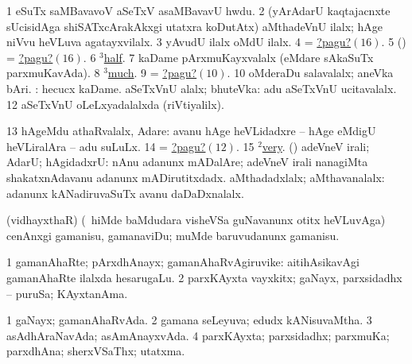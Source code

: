 \noindent
\gl{\pagu}
\bmng
\bnum
\num{1}  eSuTx saMBavavoV aSeTxV asaMBavavU hwdu. 
\num{2}  (yArAdarU kaqtajacnxte sUcisidAga shiSATxcArakAkxgi utatxra koDutAtx) aMthadeVnU ilalx; hAge niVvu heVLuva agatayxvilalx. 
\num{3}  yAvudU ilalx oMdU ilalx. 
\num{4}  = \hyperlink{notpagu16}{?pagu?\((16)\)}. 
\num{5} (\pArxparx) = \hyperlink{notpagu16}{?pagu?\((16)\)}. 
\num{6}  \hyperref{kandict_h.pdf}{H}{half(3) nuga}{$^3$half}. 
\num{7}  kaDame pArxmuKayxvalalx (eMdare sAkaSuTx parxmuKavAda). 
\num{8}  \hyperref{kandict_m.pdf}{M}{much(3) pagu(6)}{$^3$much}. 
\num{9}  = \hyperlink{notpagu10}{?pagu?\((10)\)}. 
\hypertarget{notpagu10}{} 
\num{10}  oMderaDu salavalalx; aneVka bAri. 
 : 
\banum
{} hecucx kaDame. 
 aSeTxVnU alalx; bhuteVka:  adu aSeTxVnU ucitavalalx. 
\hypertarget{notpagu12}{} 
\eanum
\numie
\num{12}  aSeTxVnU oLeLxyadalalxda (riVtiyalilx). 
\num{13}  hAgeMdu athaRvalalx, Adare:  avanu hAge heVLidadxre -- hAge eMdigU heVLiralAra -- adu suLuLx. 
\num{14}  = \hyperlink{notpagu12}{?pagu?\((12)\)}. 
\num{15}  \hyperref{kandict_v.pdf}{V}{very(2) pagu(1)}{$^2$very}. 
\hypertarget{notpagu16}{} 
 (\pArxparx) 
\banum
{} adeVneV irali; AdarU; hAgidadxrU:  nAnu adanunx mADalAre; adeVneV irali nanagiMta shakatxnAdavanu adanunx mADirutitxdadx. 
 aMthadadxlalx; aMthavanalalx: adanunx kANadiruvaSuTx avanu daDaDxnalalx. 
\eanum
\numie
\enum
\emng
\eentry

\bentry
{}
\gl{\sakirx}
\expl{\Latin}
\bmng
(vidhayxthaR) (\sA\ hiMde baMdudara visheVSa guNavanunx otitx heVLuvAga) cenAnxgi gamanisu, gamanaviDu; muMde baruvudanunx gamanisu. 
\emng
\eentry

\bentry
{}
\gl{\nA}
\bmng
\bnum
\num{1} gamanAhaRte; pArxdhAnayx; gamanAhaRvAgiruvike:  aitihAsikavAgi gamanAhaRte ilalxda hesarugaLu. 
\num{2} parxKAyxta vayxkitx; gaNayx, parxsidadhx -- puruSa; KAyxtanAma. 
\enum
\emng
\eentry

\bentry
{}
\gl{\gu}
\bmng
\bnum
\num{1} gaNayx; gamanAhaRvAda. 
\num{2} gamana seLeyuva; edudx kANisuvaMtha. 
\num{3} asAdhAraNavAda; asAmAnayxvAda. 
\num{4} parxKAyxta; parxsidadhx; parxmuKa; parxdhAna; sherxVSaThx; utatxma. 
\enum
\emng
\eentry

